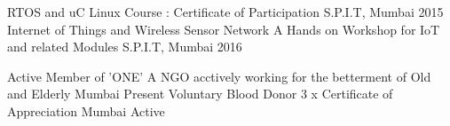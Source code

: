

\begin{cvhonors}

  \cvhonor
    {RTOS and uC Linux} %
    {Course : Certificate of Participation} %
    {S.P.I.T, Mumbai}
    {2015}
  \cvhonor
    {Internet of Things and Wireless Sensor Network} %
    {A Hands on Workshop for IoT and related Modules} %
    {S.P.I.T, Mumbai}
    {2016}
\end{cvhonors}





\begin{cvhonors}

  \cvhonor
    {Active Member of 'ONE'} %
    {A NGO acctively working for the betterment of Old and Elderly} %
    {Mumbai}
    {Present}
  \cvhonor
    {Voluntary Blood Donor} %
    {3 x Certificate of Appreciation} %
    {Mumbai}
    {Active}

\end{cvhonors}
